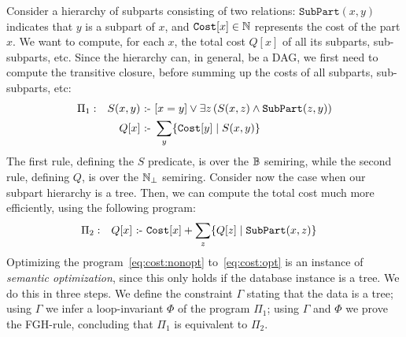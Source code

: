 \begin{ex} \label{ex:fgh:constraints}
  Consider a hierarchy of subparts consisting of two relations:
  $\texttt{SubPart}(x,y)$ indicates that $y$ is a subpart of $x$, and
  $\texttt{Cost}[x] \in \mathbb N$ represents the cost of the part $x$.  We
  want to compute, for each $x$, the total cost $Q[x]$ of all its
  subparts, sub-subparts, etc.  Since the hierarchy can, in
  general, be a DAG, we first need to compute the transitive closure, before
  summing up the costs of all
  subparts,  sub-subparts, etc:
%
  \begin{align}
\Pi_1: &&    S(x,y) \text{ :- } & [x=y] \vee \exists z\left(S(x,z) \wedge \texttt{SubPart}(z,y)\right)\label{eq:cost:nonopt}\\
       &&    Q[x] \text{ :- } & \sum_y \{{\texttt{Cost}[y]}\mid{S(x,y)}\} \nonumber
  \end{align}
%
  The first rule, defining the $S$ predicate, is over the $\mathbb B$
  semiring, while the second rule, defining $Q$, is over the $\mathbb N_\bot$
  semiring.  Consider now the case when our subpart hierarchy is a
  tree.  Then, we can compute the total cost much more efficiently,
  using the following program:
%
  \begin{align}
\Pi_2: &&    Q[x] \text{ :- } & \texttt{Cost}[x] + \sum_z \{{Q[z]}\mid{\texttt{SubPart}(x,z)}\} \label{eq:cost:opt}
  \end{align}
%
%
%
  Optimizing the program~\eqref{eq:cost:nonopt} to~\eqref{eq:cost:opt}
  is an instance of {\em semantic optimization}, since this only holds
  if the database instance is a tree.  We do this in three steps. We
  define the constraint $\Gamma$ stating that the data is a tree;
  using $\Gamma$ we infer a loop-invariant $\Phi$ of the program
  $\Pi_1$; using $\Gamma$ and $\Phi$ we prove the FGH-rule, concluding
  that $\Pi_1$ is equivalent to $\Pi_2$.


\end{ex}
